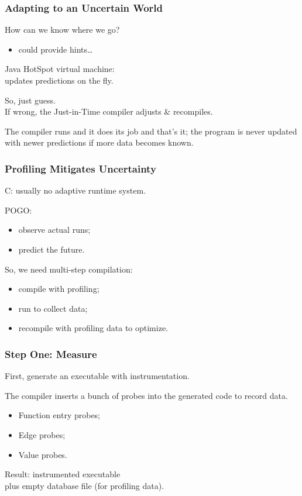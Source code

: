 \begin{frame}
\frametitle{Adapting to an Uncertain World}
\large
\begin{changemargin}{2cm}
How can we know where we go?
\begin{itemize}
\item could provide hints\ldots
\end{itemize}

Java HotSpot virtual machine: \\
updates predictions on the fly. 

So, just guess.\\
If wrong, the Just-in-Time compiler adjusts \& recompiles.

The compiler runs and it does its job and that's it; the program is never updated with newer predictions if more data becomes known.
\end{changemargin}

\end{frame}



\begin{frame}
\frametitle{Profiling Mitigates Uncertainty}

\large
\begin{changemargin}{2cm}
C: usually no adaptive runtime system.

POGO:
\begin{itemize}
\item observe actual runs;
\item predict the future.
\end{itemize}

So, we need multi-step compilation:
\begin{itemize}
\item compile with profiling;
\item run to collect data;
\item recompile with profiling data to optimize.
\end{itemize}

\end{changemargin}

\end{frame}



\begin{frame}
\frametitle{Step One: Measure}

\large
\begin{changemargin}{2cm}
First, generate an executable with instrumentation. 

The compiler inserts a bunch of probes into the generated code to record data. 
\begin{itemize}
\item Function entry probes;
\item Edge probes;
\item Value probes.
\end{itemize}

Result: instrumented executable \\
plus empty database file (for profiling data).
\end{changemargin}

\end{frame}



